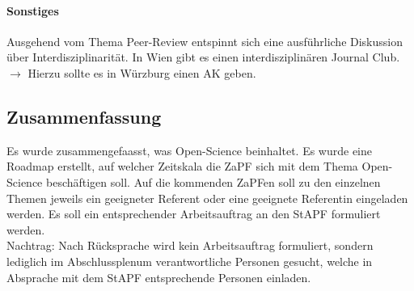     \paragraph{Sonstiges}
      Ausgehend vom Thema Peer-Review entspinnt sich eine ausführliche Diskussion über Interdisziplinarität. In Wien gibt es einen interdisziplinären Journal Club. \\
      $\rightarrow$ Hierzu sollte es in Würzburg einen AK geben.
      
  \subsection*{Zusammenfassung}
    \begin{outline}
      \1 Es wurde zusammengefaasst, was Open-Science beinhaltet.
      \1 Es wurde eine Roadmap erstellt, auf welcher Zeitskala die ZaPF sich mit dem Thema Open-Science beschäftigen soll.
      \1 Auf die kommenden ZaPFen soll zu den einzelnen Themen jeweils ein geeigneter Referent oder eine geeignete Referentin eingeladen werden.
      \1 Es soll ein entsprechender Arbeitsauftrag an den StAPF formuliert werden. \\
        Nachtrag: Nach Rücksprache wird kein Arbeitsauftrag formuliert, sondern lediglich im Abschlussplenum verantwortliche Personen gesucht, welche in Absprache mit dem StAPF entsprechende Personen einladen.
    \end{outline}
